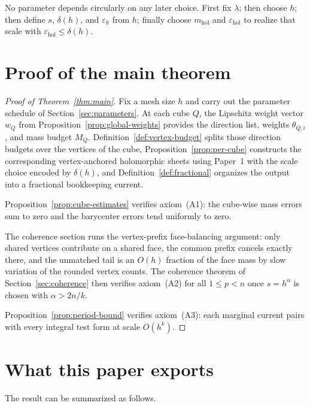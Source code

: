 \documentclass[11pt]{article}
\numberwithin{equation}{section}
\theoremstyle{plain}
\theoremstyle{definition}
\theoremstyle{remark}
\newcommand{\eps}{\varepsilon}
\newcommand{\mhol}{m_{\mathrm{hol}}}
\begin{document}
No parameter depends circularly on any later choice.  First fix $\lambda$; then choose $h$; then define $s$, $\delta(h)$, and $\eps_h$ from $h$; finally choose $\mhol$ and $\eps_{\mathrm{hol}}$ to realize that scale with $\eps_{\mathrm{hol}}\le\delta(h)$.

\section{Proof of the main theorem}\label{sec:proof}

\begin{proof}[Proof of Theorem~\ref{thm:main}]
Fix a mesh size $h$ and carry out the parameter schedule of Section~\ref{sec:parameters}.  At each cube $Q$, the Lipschitz weight vector $w_Q$ from Proposition~\ref{prop:global-weights} provides the direction list, weights $\theta_{Q,i}$, and mass budget $M_Q$.  Definition~\ref{def:vertex-budget} splits those direction budgets over the vertices of the cube, Proposition~\ref{prop:per-cube} constructs the corresponding vertex-anchored holomorphic sheets using Paper~1 with the scale choice encoded by $\delta(h)$, and Definition~\ref{def:fractional} organizes the output into a fractional bookkeeping current.

Proposition~\ref{prop:cube-estimates} verifies axiom~(A1): the cube-wise mass errors sum to zero and the barycenter errors tend uniformly to zero.

The coherence section runs the vertex-prefix face-balancing argument: only shared vertices contribute on a shared face, the common prefix cancels exactly there, and the unmatched tail is an $O(h)$ fraction of the face mass by slow variation of the rounded vertex counts.  The coherence theorem of Section~\ref{sec:coherence} then verifies axiom~(A2) for all $1\le p<n$ once $s=h^\alpha$ is chosen with $\alpha>2n/k$.

Proposition~\ref{prop:period-bound} verifies axiom~(A3): each marginal current pairs with every integral test form at scale $O(h^k)$.
\end{proof}

\section{What this paper exports}\label{sec:exports}

The result can be summarized as follows.
\end{document}
